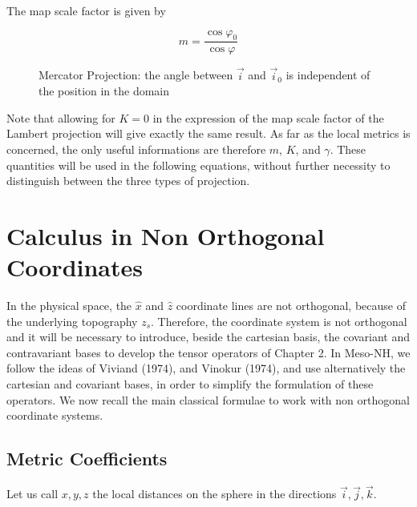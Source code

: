 The map scale factor is given by

\begin{equation}
m = \dfrac{\cos\varphi _{0} }{\cos\varphi }
\end{equation}

\begin{figure}[hpbt]
\caption{Mercator Projection: the angle between $\vec{i}$ and $\vec{i}_0$
is independent of the position in the domain \label{mercator}}
\end{figure}

Note that allowing for $K=0$ in the expression of the map scale factor of
the Lambert projection will give exactly the same result. As far as the
local metrics is concerned, the only useful informations are therefore
$m$, $K$, and $\gamma$. These quantities
 will be used in the following equations, without further
necessity to distinguish between the three types of projection.

\section{Calculus in Non Orthogonal Coordinates}

In the physical space, the $\widehat{x}$ and $\widehat{z}$ coordinate lines
are not orthogonal, because of the underlying topography $z_s$. Therefore,
the coordinate system is not orthogonal and it will be necessary to introduce,
beside the cartesian basis, the covariant and contravariant bases to
develop the tensor operators of Chapter 2. In Meso-NH, we follow the ideas
of Viviand (1974), and Vinokur (1974), and use alternatively the
cartesian and covariant bases, in order to simplify the formulation of
these operators. We now recall the main classical formulae to work with
non orthogonal coordinate systems.

\subsection{Metric Coefficients}

Let us call $x,y,z$ the local distances on the sphere in the directions
$\vec{i},\vec{j},\vec{k}$.

